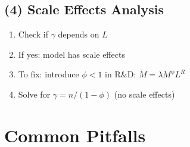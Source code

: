 \documentclass[a4paper,11pt]{article}
\begin{document}
\subsection*{(4) Scale Effects Analysis}
\begin{enumerate}
    \item Check if $\gamma$ depends on $L$
    \item If yes: model has scale effects
    \item To fix: introduce $\phi < 1$ in R\&D: $\dot{M} = \lambda M^\phi L^R$
    \item Solve for $\gamma = n/(1-\phi)$ (no scale effects)
\end{enumerate}

\clearpage

\section{Common Pitfalls}
\end{document}
